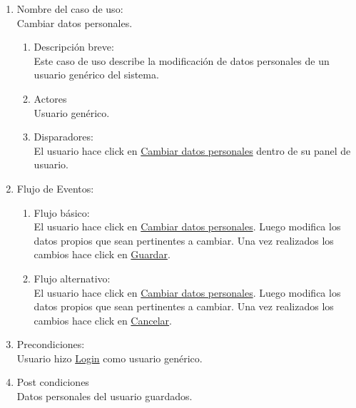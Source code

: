 \documentclass[a4paper,11pt]{article}
\begin{document}
\renewcommand{\theenumiii}{\arabic{enumiii}.}
\renewcommand{\labelenumiii}{\theenumiii}





\begin{enumerate}

    \item Nombre del caso de uso: \\
    Cambiar datos personales.

    \begin{enumerate}
    \item Descripción breve: \\
        Este caso de uso describe la modificación de datos personales de un 
        usuario genérico del sistema.
    \item Actores \\
        Usuario genérico.
    \item Disparadores: \\
        El usuario hace click en \underline{Cambiar datos personales}
        dentro de su panel de usuario.
    \end{enumerate}

    \item Flujo de Eventos: \\

    \begin{enumerate}

        \item Flujo básico:\\
            El usuario hace click en \underline{Cambiar datos personales}.
            Luego modifica los datos propios que sean pertinentes a cambiar.
            Una vez realizados los cambios hace click en \underline{Guardar}.
        \item Flujo alternativo:\\
            El usuario hace click en \underline{Cambiar datos personales}.
            Luego modifica los datos propios que sean pertinentes a cambiar.
            Una vez realizados los cambios hace click en \underline{Cancelar}.
    \end{enumerate}

    \item Precondiciones: \\
        Usuario hizo \underline{Login} como usuario genérico.

    \item Post condiciones \\
        Datos personales del usuario guardados.

\end{enumerate}
\end{document}
